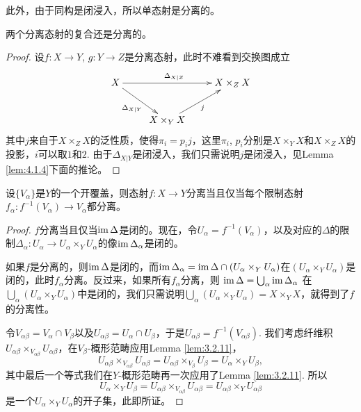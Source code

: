 此外，由于同构是闭浸入，所以单态射是分离的。

\begin{pro}
两个分离态射的复合还是分离的。
\end{pro}

\begin{proof}
设$f:X\to Y$, $g:Y\to Z$是分离态射，此时不难看到交换图成立
\[
\begin{xy}
\xymatrix{
	X \ar[rr]^{\Delta_{X|Z}}\ar[dr]_{\Delta_{X|Y}}&&X\times_Z X\\
	&X\times_Y X \ar[ur]_j&
	}
\end{xy}
\]
其中$j$来自于$X\times_Z X$的泛性质，使得$\pi_i=p_ij$，这里$\pi_i$, $p_i$分别是$X\times_Y X$和$X\times_Z X$的投影，$i$可以取$1$和$2$. 由于$\Delta_{X|Y}$是闭浸入，我们只需说明$j$是闭浸入，见Lemma \ref{lem:4.1.4}下面的推论。
\end{proof}

\begin{pro}
	设$\{V_\alpha\}$是$Y$的一个开覆盖，则态射$f:X\to Y$分离当且仅当每个限制态射$f_\alpha:f^{-1}(V_\alpha)\to V_\alpha$都分离。
\end{pro}

\begin{proof}
	$f$分离当且仅当$\operatorname{im} \Delta$是闭的。现在，令$U_\alpha=f^{-1}(V_\alpha)$，以及对应的$\Delta$的限制$\Delta_\alpha:U_\alpha\to U_\alpha\times_Y U_\alpha$的像$\operatorname{im} \Delta_\alpha$是闭的。

	如果$f$是分离的，则$\operatorname{im} \Delta$是闭的，而$\operatorname{im} \Delta_{\alpha}=\operatorname{im} \Delta \cap (U_\alpha\times_Y U_\alpha)$在$(U_\alpha\times_Y U_\alpha)$是闭的，此时$f_\alpha$分离。反过来，如果所有$f_\alpha$分离，则
	$
	\operatorname{im} \Delta=\bigcup_\alpha \operatorname{im} \Delta_{\alpha}
	$
	在$\bigcup_\alpha (U_\alpha\times_Y U_\alpha)$中是闭的，我们只需说明$\bigcup_\alpha (U_\alpha\times_Y U_\alpha)=X\times_Y X$，就得到了$f$的分离性。

	令$V_{\alpha\beta}=V_\alpha\cap V_\beta$以及$U_{\alpha\beta}=U_\alpha\cap U_\beta$，于是$U_{\alpha\beta}=f^{-1}(V_{\alpha\beta})$. 我们考虑纤维积$U_{\alpha\beta}\times_{V_{\alpha\beta}}U_{\alpha\beta}$，在$V_\beta$-概形范畴应用Lemma \ref{lem:3.2.11}，
	\[
	U_{\alpha\beta}\times_{V_{\alpha\beta}}U_{\alpha\beta}=U_{\alpha\beta}\times_{V_\beta} U_\beta=U_{\alpha}\times_{Y} U_\beta,
	\]
	其中最后一个等式我们在$Y$-概形范畴再一次应用了Lemma \ref{lem:3.2.11}. 所以
	\[
	U_\alpha\times_Y U_\beta=U_{\alpha\beta}\times_{V_{\alpha\beta}}U_{\alpha\beta}=U_{\alpha\beta}\times_{Y}U_{\alpha\beta}
	\]
	是一个$U_\alpha\times_Y U_\alpha$的开子集，此即所证。
\end{proof}

